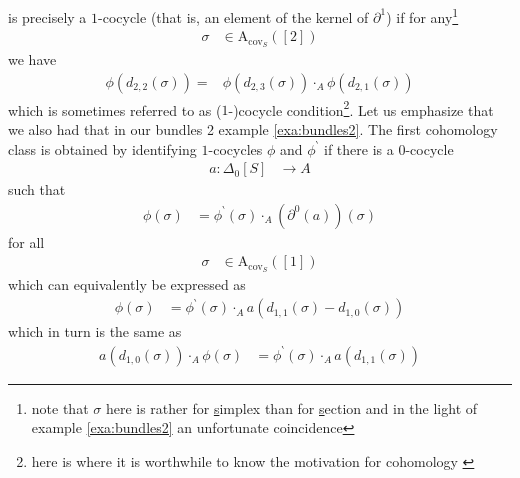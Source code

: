 is precisely a $1$-cocycle (that is, an element of the kernel of $\partial^{1}$) if for any\footnote{note that $\sigma$ here is rather for \underline{s}implex than for \underline{s}ection and in the light of example \ref{exa:bundles2} an unfortunate coincidence}
\begin{align*}
  \sigma
  &\in
  \mathrm{A}_{\mathrm{cov}_{S}}
  ([2])
\end{align*}
we have
\begin{align*}
  \phi
  \left(
    d_{2,2}(\sigma)
  \right)
  =
  &\phi
  \left(
    d_{2,3}(\sigma)
  \right)
  \cdot_{A}
  \phi
  \left(
    d_{2,1}(\sigma)
  \right)
\end{align*}
which is sometimes referred to as ($1$-)cocycle condition\footnote{here is where it is worthwhile to know the motivation for cohomology \cite{8b5861fc}}. Let us emphasize that we also had that in our bundles 2 example \ref{exa:bundles2}. The first cohomology class is obtained by identifying $1$-cocycles $\phi$ and $\phi^{\backprime}$ if there is a $0$-cocycle
\begin{align*}
  a
  \colon
  \Delta_{0}[S]
  &\rightarrow
  A
\end{align*}
such that
\begin{align*}
  \phi(\sigma)
  &=
  \phi^{\backprime}(\sigma)
  \cdot_{A}
  \left(
    \partial^{0}
    \left(
      a
    \right)
  \right)
  (\sigma)
\end{align*}
for all
\begin{align*}
  \sigma
  &\in
  \mathrm{A}_{\mathrm{cov}_{S}}
  ([1])
\end{align*}
which can equivalently be expressed as
\begin{align*}
  \phi(\sigma)
  &=
  \phi^{\backprime}(\sigma)
  \cdot_{A}
  a
  \left(
    d_{1,1}(\sigma)
    -
    d_{1,0}(\sigma)
  \right)
\end{align*}
which in turn is the same as
\begin{align*}
  a
  \left(
    d_{1,0}(\sigma)
  \right)
  \cdot_{A}
  \phi(\sigma)
  &=
  \phi^{\backprime}(\sigma)
  \cdot_{A}
  a
  \left(
    d_{1,1}(\sigma)
  \right)
\end{align*}
